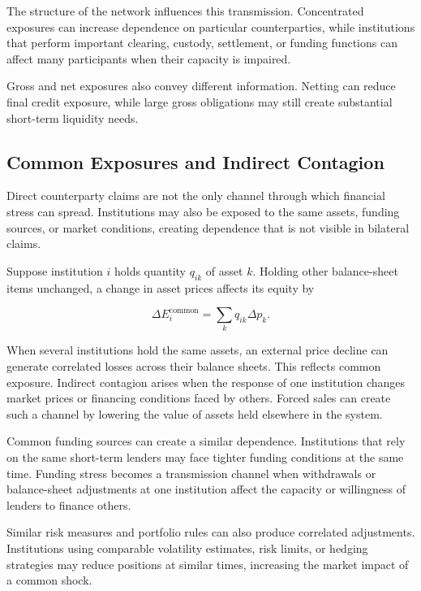 The structure of the network influences this transmission. Concentrated exposures can increase dependence on particular counterparties, while institutions that perform important clearing, custody, settlement, or funding functions can affect many participants when their capacity is impaired.

Gross and net exposures also convey different information. Netting can reduce final credit exposure, while large gross obligations may still create substantial short-term liquidity needs.

\subsection{Common Exposures and Indirect Contagion}

Direct counterparty claims are not the only channel through which financial stress can spread. Institutions may also be exposed to the same assets, funding sources, or market conditions, creating dependence that is not visible in bilateral claims.

Suppose institution \(i\) holds quantity \(q_{ik}\) of asset \(k\). Holding other balance-sheet items unchanged, a change in asset prices affects its equity by

\begin{equation}
\Delta E_i^{\mathrm{common}}
=
\sum_k q_{ik}\Delta p_k.
\label{eq:ch21-common-exposure-loss}
\end{equation}

When several institutions hold the same assets, an external price decline can generate correlated losses across their balance sheets. This reflects common exposure. Indirect contagion arises when the response of one institution changes market prices or financing conditions faced by others. Forced sales can create such a channel by lowering the value of assets held elsewhere in the system.

Common funding sources can create a similar dependence. Institutions that rely on the same short-term lenders may face tighter funding conditions at the same time. Funding stress becomes a transmission channel when withdrawals or balance-sheet adjustments at one institution affect the capacity or willingness of lenders to finance others.

Similar risk measures and portfolio rules can also produce correlated adjustments. Institutions using comparable volatility estimates, risk limits, or hedging strategies may reduce positions at similar times, increasing the market impact of a common shock.

